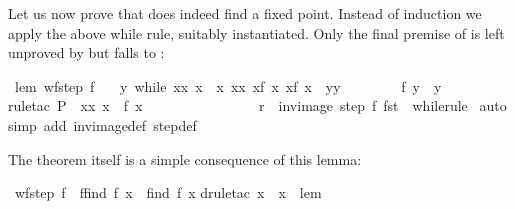 \begin{isabellebody}
\begin{isamarkuptext}
Let us now prove that  does indeed find a fixed point. Instead
of induction we apply the above while rule, suitably instantiated.
Only the final premise of  is left unproved
by  but falls to :%
\end{isamarkuptext}%
\isamarkuptrue%
\ lem{\isacharcolon}\ {\isachardoublequote}wf{\isacharparenleft}step{}\ f{\isacharparenright}\ {\isasymLongrightarrow}\isanewline
\ \ {\isasymexists}y{\isachardot}\ while\ {\isacharparenleft}{\isasymlambda}{\isacharparenleft}x{\isacharcomma}x{\isacharprime}{\isacharparenright}{\isachardot}\ x{\isacharprime}\ {\isasymnoteq}\ x{\isacharparenright}\ {\isacharparenleft}{\isasymlambda}{\isacharparenleft}x{\isacharcomma}x{\isacharprime}{\isacharparenright}{\isachardot}\ {\isacharparenleft}x{\isacharprime}{\isacharcomma}f\ x{\isacharprime}{\isacharparenright}{\isacharparenright}\ {\isacharparenleft}x{\isacharcomma}f\ x{\isacharparenright}\ {\isacharequal}\ {\isacharparenleft}y{\isacharcomma}y{\isacharparenright}\ {\isasymand}\isanewline
\ \ \ \ \ \ \ f\ y\ {\isacharequal}\ y{\isachardoublequote}\isanewline
\isamarkupfalse%
rule{\isacharunderscore}tac\ P\ {\isacharequal}\ {\isachardoublequote}{\isasymlambda}{\isacharparenleft}x{\isacharcomma}x{\isacharprime}{\isacharparenright}{\isachardot}\ x{\isacharprime}\ {\isacharequal}\ f\ x{\isachardoublequote}\ \isanewline
\ \ \ \ \ \ \ \ \ \ \ \ \ \ \ r\ {\isacharequal}\ {\isachardoublequote}inv{\isacharunderscore}image\ {\isacharparenleft}step{}\ f{\isacharparenright}\ fst{\isachardoublequote}\ \ while{\isacharunderscore}rule{\isacharparenright}\isanewline
\isamarkupfalse%
\ auto\isanewline
\isamarkupfalse%
simp\ add{\isacharcolon}\ inv{\isacharunderscore}image{\isacharunderscore}def\ step{}{\isacharunderscore}def{\isacharparenright}\isanewline
\isamarkupfalse%
\isamarkupfalse%
%
\begin{isamarkuptext}%
The theorem itself is a simple consequence of this lemma:%
\end{isamarkuptext}%
\isamarkuptrue%
\ {\isachardoublequote}wf{\isacharparenleft}step{}\ f{\isacharparenright}\ {\isasymLongrightarrow}\ f{\isacharparenleft}find{}\ f\ x{\isacharparenright}\ {\isacharequal}\ find{}\ f\ x{\isachardoublequote}\isanewline
\isamarkupfalse%
drule{\isacharunderscore}tac\ x\ {\isacharequal}\ x\ \ lem{\isacharparenright}\isanewline

\end{isabellebody}
